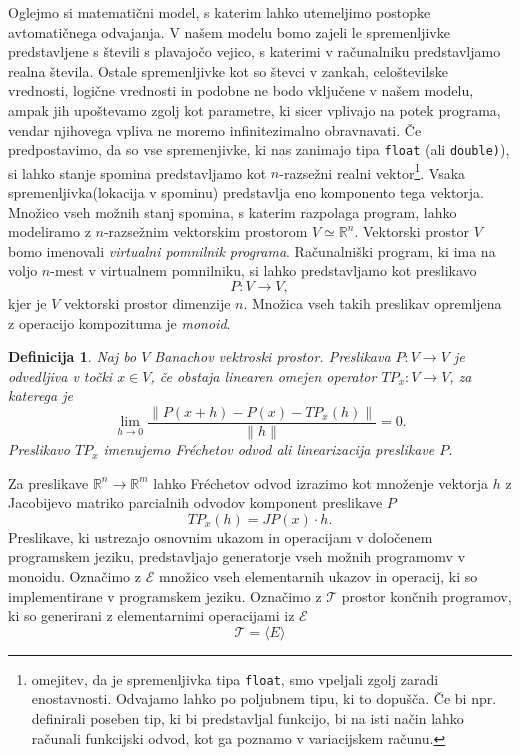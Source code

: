 \documentclass{article}
\newcommand{\RR}{\mathbb{R}}
\newcommand{\E}{\mathcal{E}}
\newcommand{\T}{\mathcal{T}}
\newtheorem{definicija}{Definicija}[section]
\begin{document}
Oglejmo si matematični model, s katerim lahko utemeljimo postopke avtomatičnega
odvajanja. V našem modelu bomo zajeli le spremenljivke predstavljene s števili s
plavajočo vejico,  s katerimi v računalniku predstavljamo realna števila. 
Ostale spremenljivke kot so števci v zankah, celoštevilske vrednosti, logične
vrednosti in podobne ne bodo vključene v našem modelu, ampak jih upoštevamo
zgolj kot parametre, ki sicer vplivajo na potek programa, vendar njihovega
vpliva ne moremo infinitezimalno obravnavati. Če predpostavimo, da so vse
spremenjivke, ki nas zanimajo tipa \texttt{float} (ali \texttt{double)}), si lahko stanje spomina
predstavljamo kot $n$-razsežni realni vektor\footnote[1]{omejitev, da je
  spremenljivka tipa \texttt{float}, smo vpeljali zgolj zaradi enostavnosti.
  Odvajamo lahko po poljubnem tipu, ki to dopušča. Če bi npr. definirali
  poseben tip, ki bi predstavljal funkcijo, bi na isti način lahko računali
  funkcijski odvod, kot ga poznamo v variacijskem računu.}. Vsaka spremenljivka(lokacija v
spominu) predstavlja eno komponento tega vektorja. Množico vseh možnih stanj
spomina, s katerim razpolaga program, lahko modeliramo z $n$-razsežnim
vektorskim prostorom $V\simeq\RR^n$. Vektorski prostor $V$ bomo imenovali
\emph{virtualni pomnilnik programa}. Računalniški program, ki
ima na voljo $n$-mest v virtualnem pomnilniku, si lahko predstavljamo kot preslikavo
\begin{equation}
  \label{eq:program_kot_preslikava}
  P: V\to V,
\end{equation}
kjer je $V$ vektorski prostor dimenzije $n$. Množica vseh takih preslikav
opremljena z operacijo kompozituma je \emph{monoid}.
\begin{definicija}
  Naj bo $V$ Banachov vektroski prostor. Preslikava $P:V\to V$ je odvedljiva v
  točki $x\in V$, če obstaja
  linearen omejen operator $TP_x:V\to V$, za katerega je
  \begin{equation}
    \label{eq:frechet}
    \lim_{h\to 0}\frac{\|P(x+h)-P(x)-TP_x(h)\|}{\|h\|} = 0.
  \end{equation}
  Preslikavo $TP_x$ imenujemo \emph{Fréchetov odvod} ali \emph{linearizacija}
  preslikave $P$.
\end{definicija}
Za preslikave $\RR^n\to \RR^m$ lahko Fréchetov odvod
izrazimo kot množenje vektorja $h$ z Jacobijevo matriko parcialnih odvodov
komponent preslikave $P$
\begin{equation*}
  TP_x(h) = JP(x)\cdot h.
\end{equation*}
Preslikave, ki ustrezajo osnovnim ukazom in operacijam v določenem
programskem jeziku, predstavljajo generatorje vseh možnih programomv v
monoidu. Označimo z $\E$ množico vseh elementarnih ukazov in operacij, ki so
implementirane v programskem jeziku. Označimo z $\T$ prostor končnih programov,
ki so generirani z elementarnimi operacijami iz $\E$
\begin{equation*}
  \T=\langle E \rangle
\end{equation*}
\end{document}

